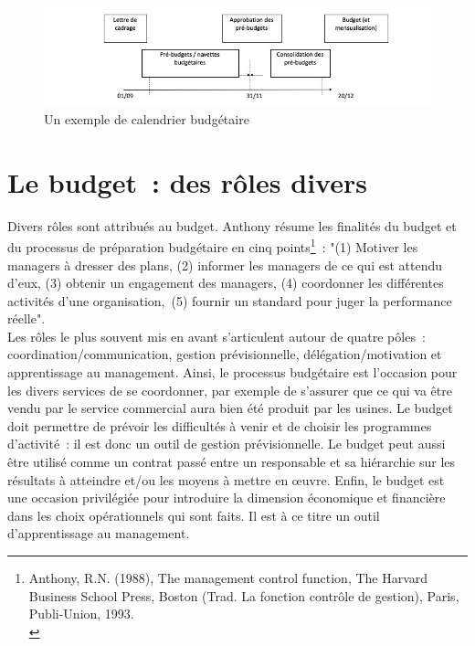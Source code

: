 \documentclass{kaobook}
\begin{document}
\begin{figure}[htbp]
\centering
\includegraphics[width=.9\linewidth]{./img/budgetcal.jpeg}
\caption{Un exemple de calendrier budgétaire}
\end{figure}
\section{Le budget : des rôles divers}
\label{sec:orge390604}
Divers rôles sont attribués au budget. Anthony résume les finalités du budget et du processus de préparation budgétaire en cinq points\footnote{Anthony, R.N. (1988), The management control function, The Harvard Business School Press, Boston (Trad. La fonction contrôle de gestion), Paris, Publi-Union, 1993.\\} : "(1) Motiver les managers à dresser des plans, (2) informer les managers de ce qui est attendu d'eux, (3) obtenir un engagement des managers, (4) coordonner les différentes activités d'une organisation, (5) fournir un standard pour juger la performance réelle".\\
Les rôles le plus souvent mis en avant s'articulent autour de quatre pôles : coordination/communication, gestion prévisionnelle, délégation/motivation et apprentissage au management. Ainsi, le processus budgétaire est l'occasion pour les divers services de se coordonner, par exemple de s'assurer que ce qui va être vendu par le service commercial aura bien été produit par les usines. Le budget doit permettre de prévoir les difficultés à venir et de choisir les programmes d'activité : il est donc un outil de gestion prévisionnelle. Le budget peut aussi être utilisé comme un contrat passé entre un responsable et sa hiérarchie sur les résultats à atteindre et/ou les moyens à mettre en œuvre. Enfin, le budget est une occasion privilégiée pour introduire la dimension économique et financière dans les choix opérationnels qui sont faits. Il est à ce titre un outil d'apprentissage au management.\\
\end{document}
